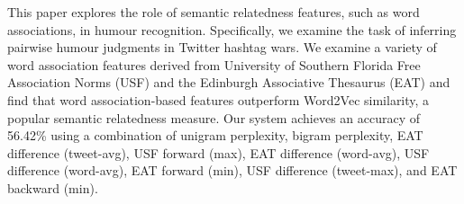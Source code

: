 This paper explores the role of semantic relatedness features, such as word associations, in humour recognition. Specifically, we examine the task of inferring pairwise humour judgments in Twitter hashtag wars. We examine a variety of word association features derived from University of Southern Florida Free Association Norms (USF) and the Edinburgh Associative Thesaurus (EAT) and find that word association-based features outperform Word2Vec similarity, a popular semantic relatedness measure. Our system achieves an accuracy of 56.42\% using a combination of unigram perplexity, bigram perplexity, EAT difference (tweet-avg), USF forward (max), EAT difference (word-avg), USF difference (word-avg), EAT forward (min), USF difference (tweet-max), and EAT backward (min).
